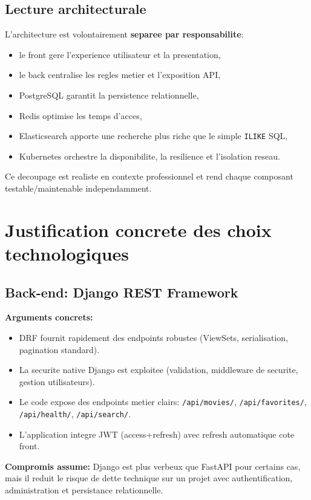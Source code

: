 \documentclass[11pt,a4paper]{article}
\begin{document}
\subsection{Lecture architecturale}

L'architecture est volontairement \textbf{separee par responsabilite}:
\begin{itemize}
  \item le front gere l'experience utilisateur et la presentation,
  \item le back centralise les regles metier et l'exposition API,
  \item PostgreSQL garantit la persistence relationnelle,
  \item Redis optimise les temps d'acces,
  \item Elasticsearch apporte une recherche plus riche que le simple \texttt{ILIKE} SQL,
  \item Kubernetes orchestre la disponibilite, la resilience et l'isolation reseau.
\end{itemize}

Ce decoupage est realiste en contexte professionnel et rend chaque composant testable/maintenable independamment.

\section{Justification concrete des choix technologiques}

\subsection{Back-end: Django REST Framework}

\textbf{Arguments concrets:}
\begin{itemize}
  \item DRF fournit rapidement des endpoints robustes (ViewSets, serialisation, pagination standard).
  \item La securite native Django est exploitee (validation, middleware de securite, gestion utilisateurs).
  \item Le code expose des endpoints metier clairs: \texttt{/api/movies/}, \texttt{/api/favorites/}, \texttt{/api/health/}, \texttt{/api/search/}.
  \item L'application integre JWT (access+refresh) avec refresh automatique cote front.
\end{itemize}

\textbf{Compromis assume:} Django est plus verbeux que FastAPI pour certains cas, mais il reduit le risque de dette technique
sur un projet avec authentification, administration et persistance relationnelle.
\end{document}
